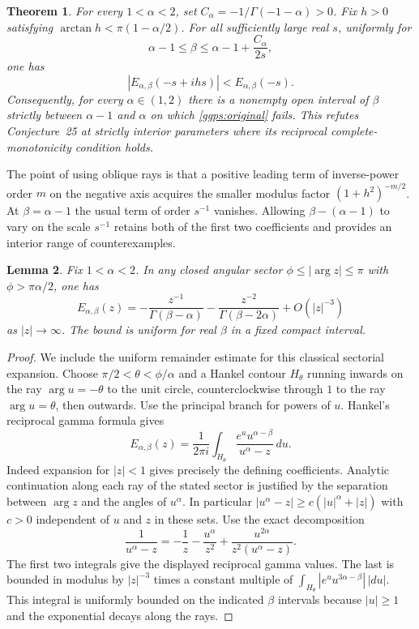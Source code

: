 \documentclass[11pt,a4paper]{article}
\newtheorem{theorem}{Theorem}[section]
\newtheorem{lemma}[theorem]{Lemma}
\theoremstyle{definition}
\theoremstyle{remark}
\numberwithin{equation}{section}
\begin{document}
\begin{theorem}\label{ggps:main}
For every $1<\alpha<2$, set $C_\alpha=-1/\Gamma(-1-\alpha)>0$.
Fix $h>0$ satisfying $\arctan h<\pi(1-\alpha/2)$.
For all sufficiently large real $s$, uniformly for
\[
  \alpha-1\le\beta\le\alpha-1+\frac{C_\alpha}{2s},
\]
one has
\[
  |E_{\alpha,\beta}(-s+ihs)|<E_{\alpha,\beta}(-s).
\]
Consequently, for every $\alpha\in(1,2)$ there is a nonempty open
interval of $\beta$ strictly between $\alpha-1$ and $\alpha$ on which
\eqref{ggps:original} fails. This refutes Conjecture~25 at strictly
interior parameters where its reciprocal complete-monotonicity condition
holds.
\end{theorem}

The point of using oblique rays is that a positive leading term of
inverse-power order $m$ on the negative axis acquires the smaller
modulus factor $(1+h^2)^{-m/2}$. At $\beta=\alpha-1$ the usual
term of order $s^{-1}$ vanishes. Allowing $\beta-(\alpha-1)$ to vary
on the scale $s^{-1}$ retains both of the first two coefficients and
provides an interior range of counterexamples.

\begin{lemma}\label{ggps:expansion}
Fix $1<\alpha<2$. In any closed angular sector
$\phi\le |\arg z|\le\pi$ with $\phi>\pi\alpha/2$, one has
\[
 E_{\alpha,\beta}(z)=-\frac{z^{-1}}{\Gamma(\beta-\alpha)}
                      -\frac{z^{-2}}{\Gamma(\beta-2\alpha)}
                      +O(|z|^{-3})
\]
as $|z|\to\infty$. The bound is uniform for real $\beta$ in a fixed
compact interval.
\end{lemma}
\begin{proof}
We include the uniform remainder estimate for this classical sectorial
expansion. Choose $\pi/2<\theta<\phi/\alpha$ and a Hankel contour
$H_\theta$ running inwards on the ray $\arg u=-\theta$ to the unit
circle, counterclockwise through $1$ to the ray $\arg u=\theta$, then
outwards. Use the principal branch for powers of $u$. Hankel's
reciprocal gamma formula gives
\[
 E_{\alpha,\beta}(z)=\frac{1}{2\pi i}\int_{H_\theta}
        \frac{e^u u^{\alpha-\beta}}{u^\alpha-z}\,du.
\]
Indeed expansion for $|z|<1$ gives precisely the defining coefficients.
Analytic continuation along each ray of the stated sector is justified
by the separation between $\arg z$ and the angles of $u^\alpha$.
In particular $|u^\alpha-z|\ge c(|u|^\alpha+|z|)$ with $c>0$
independent of $u$ and $z$ in these sets. Use the exact decomposition
\[
 \frac{1}{u^\alpha-z}=-\frac1z-\frac{u^\alpha}{z^2}
                +\frac{u^{2\alpha}}{z^2(u^\alpha-z)}.
\]
The first two integrals give the displayed reciprocal gamma values.
The last is bounded in modulus by $|z|^{-3}$ times a constant
multiple of $\int_{H_\theta}|e^u u^{3\alpha-\beta}|\,|du|$.
This integral is uniformly bounded on the indicated $\beta$ intervals
because $|u|\ge1$ and the exponential decays along the rays.
\end{proof}
\end{document}
